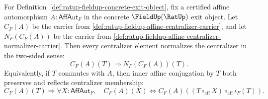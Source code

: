 \begin{theorem}
\label{thm:ratup-fieldup-affine-centralizer-normalizer-inclusion}
For Definition~\ref{def:ratup-fieldup-concrete-exit-object}, fix a certified
affine automorphism $A:\mathsf{AffAut}_F$ in the concrete
$\FieldUp(\RatUp)$ exit object. Let $C_F(A)$ be the carrier from
\autoref{def:ratup-fieldup-affine-centralizer-carrier}, and let
$N_F(C_F(A))$ be the carrier from
\autoref{def:ratup-fieldup-affine-centralizer-normalizer-carrier}. Then every
centralizer element normalizes the centralizer in the two-sided sense:
$$
C_F(A)(T)\Rightarrow N_F(C_F(A))(T).
$$
Equivalently, if $T$ commutes with $A$, then inner affine conjugation by $T$
both preserves and reflects centralizer membership:
$$
C_F(A)(T)\Rightarrow
\forall X:\mathsf{AffAut}_F,\quad
C_F(A)(X)
\Longleftrightarrow
C_F(A)((T\circ_{\mathrm{aff}}X)\circ_{\mathrm{aff}}\iota_F(T)).
$$
\end{theorem}
